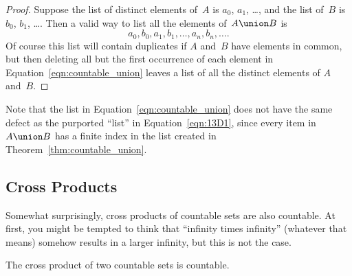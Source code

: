 \begin{proof}

Suppose the list of distinct elements of~$A$ is $a_0$, $a_1$, \dots,
and the list of~$B$ is $b_0$, $b_1$, \dots.  Then a valid way to list
all the elements of~$A \union B$ is
\begin{equation}\label{eqn:countable_union}
    a_0, b_0, a_1, b_1, \dots, a_n, b_n, \dots.
\end{equation}
Of course this list will contain duplicates if $A$ and~$B$ have
elements in common, but then deleting all but the first occurrence of
each element in Equation~\ref{eqn:countable_union} leaves a list of
all the distinct elements of $A$ and~$B$.
\end{proof}

Note that the list in Equation~\ref{eqn:countable_union} does not have
the same defect as the purported ``list'' in Equation~\ref{eqn:13D1},
since every item in~$A \union B$ has a finite index in the list
created in Theorem~\ref{thm:countable_union}.

\subsection{Cross Products}

Somewhat surprisingly, cross products of countable sets are also
countable.  At first, you might be tempted to think that ``infinity
times infinity'' (whatever that means) somehow results in a larger
infinity, but this is not the case.

\begin{theorem}\label{thm:countable_products}\label{thm:13D5}
The cross product of two countable sets is countable.
\end{theorem}

